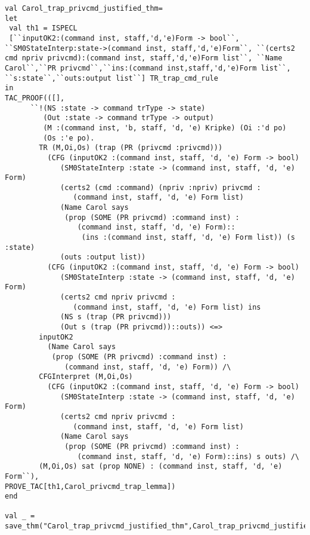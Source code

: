 \documentclass{report}
\begin{document}
\begin{lstlisting}[frame=TBlr]
val Carol_trap_privcmd_justified_thm=
let
 val th1 = ISPECL
 [``inputOK2:(command inst, staff,'d,'e)Form -> bool``, ``SM0StateInterp:state->(command inst, staff,'d,'e)Form``, ``(certs2 cmd npriv privcmd):(command inst, staff,'d,'e)Form list``, ``Name Carol``,``PR privcmd``,``ins:(command inst,staff,'d,'e)Form list``, ``s:state``,``outs:output list``] TR_trap_cmd_rule
in
TAC_PROOF(([],
      ``!(NS :state -> command trType -> state)
         (Out :state -> command trType -> output)
         (M :(command inst, 'b, staff, 'd, 'e) Kripke) (Oi :'d po)
         (Os :'e po).
        TR (M,Oi,Os) (trap (PR (privcmd :privcmd)))
          (CFG (inputOK2 :(command inst, staff, 'd, 'e) Form -> bool)
             (SM0StateInterp :state -> (command inst, staff, 'd, 'e) Form)
             (certs2 (cmd :command) (npriv :npriv) privcmd :
                (command inst, staff, 'd, 'e) Form list)
             (Name Carol says
              (prop (SOME (PR privcmd) :command inst) :
                 (command inst, staff, 'd, 'e) Form)::
                  (ins :(command inst, staff, 'd, 'e) Form list)) (s :state)
             (outs :output list))
          (CFG (inputOK2 :(command inst, staff, 'd, 'e) Form -> bool)
             (SM0StateInterp :state -> (command inst, staff, 'd, 'e) Form)
             (certs2 cmd npriv privcmd :
                (command inst, staff, 'd, 'e) Form list) ins
             (NS s (trap (PR privcmd)))
             (Out s (trap (PR privcmd))::outs)) <=>
        inputOK2
          (Name Carol says
           (prop (SOME (PR privcmd) :command inst) :
              (command inst, staff, 'd, 'e) Form)) /\
        CFGInterpret (M,Oi,Os)
          (CFG (inputOK2 :(command inst, staff, 'd, 'e) Form -> bool)
             (SM0StateInterp :state -> (command inst, staff, 'd, 'e) Form)
             (certs2 cmd npriv privcmd :
                (command inst, staff, 'd, 'e) Form list)
             (Name Carol says
              (prop (SOME (PR privcmd) :command inst) :
                 (command inst, staff, 'd, 'e) Form)::ins) s outs) /\
        (M,Oi,Os) sat (prop NONE) : (command inst, staff, 'd, 'e) Form``),
PROVE_TAC[th1,Carol_privcmd_trap_lemma])
end

val _ = save_thm("Carol_trap_privcmd_justified_thm",Carol_trap_privcmd_justified_thm)


\end{lstlisting}
\end{document}
